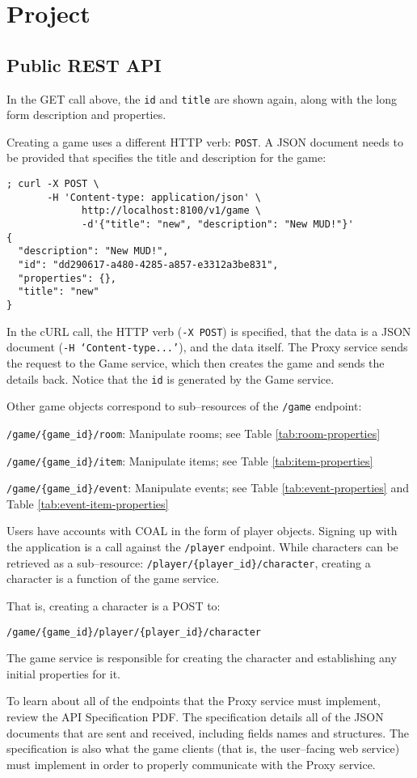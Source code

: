 \documentclass{article}
\newcommand{\enterProblemHeader}[1]{
}
\newcommand{\exitProblemHeader}[1]{
\nobreak\extramarks{#1}{}\nobreak
}
\newcounter{homeworkProblemCounter} %
\newcommand{\homeworkProblemName}{}
\newenvironment{homeworkProblem}[1][Problem \arabic{homeworkProblemCounter}]{ %
\stepcounter{homeworkProblemCounter} %
\renewcommand{\homeworkProblemName}{#1} %
\section{\homeworkProblemName} %
\enterProblemHeader{\homeworkProblemName} %
}{
\exitProblemHeader{\homeworkProblemName} %
}
\newcommand{\homeworkSectionName}{}
\newenvironment{homeworkSection}[1]{ %
\renewcommand{\homeworkSectionName}{#1} %
\subsection{\homeworkSectionName} %
\enterProblemHeader{\homeworkProblemName\ [\homeworkSectionName]} %
}{
\enterProblemHeader{\homeworkProblemName} %
}
\begin{document}
\begin{homeworkProblem}[Project]
\begin{homeworkSection}{Public REST API}
	In the GET call above, the \texttt{id} and \texttt{title} are shown again, along with the long form description and properties.

	Creating a game uses a different HTTP verb: \texttt{POST}. A JSON document needs to be provided that specifies the title and description for the game:

\begin{Verbatim}[fontsize=\small]
; curl -X POST \
       -H 'Content-type: application/json' \
			 http://localhost:8100/v1/game \
			 -d'{"title": "new", "description": "New MUD!"}'
{
  "description": "New MUD!",
  "id": "dd290617-a480-4285-a857-e3312a3be831",
  "properties": {},
  "title": "new"
}
\end{Verbatim}

	In the cURL call, the HTTP verb (\texttt{-X POST}) is specified, that the data is a JSON document (\texttt{-H `Content-type...'}), and the data itself. The Proxy service sends the request to the Game service, which then creates the game and sends the details back. Notice that the \texttt{id} is generated by the Game service.

	Other game objects correspond to sub--resources of the \texttt{/game} endpoint:
	\begin{compactitem}
		\item \texttt{/game/\{game\_id\}/room}: Manipulate rooms; see Table \ref{tab:room-properties}
		\item \texttt{/game/\{game\_id\}/item}: Manipulate items; see Table \ref{tab:item-properties}
		\item \texttt{/game/\{game\_id\}/event}: Manipulate events; see Table \ref{tab:event-properties} and Table \ref{tab:event-item-properties}
	\end{compactitem}
	
	Users have accounts with COAL in the form of player objects. Signing up with the application is a call against the \texttt{/player} endpoint. While characters can be retrieved as a sub--resource: \texttt{/player/\{player\_id\}/character}, creating a character is a function of the game service. 
	
	That is, creating a character is a POST to:
	 
	\texttt{/game/\{game\_id\}/player/\{player\_id\}/character} 
	
	The game service is responsible for creating the character and establishing any initial properties for it.

	To learn about all of the endpoints that the Proxy service must implement, review the API Specification PDF. The specification details all of the JSON documents that are sent and received, including fields names and structures. The specification is also what the game clients (that is, the user--facing web service) must implement in order to properly communicate with the Proxy service.
\end{homeworkSection}


\end{homeworkProblem}
\end{document}

